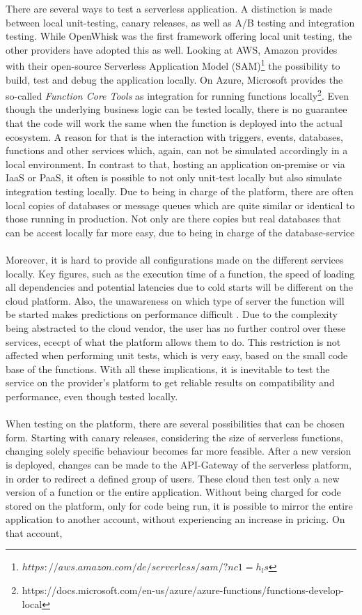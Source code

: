 \documentclass[a4paper,twoside,11pt, pagesize]{scrartcl}
\begin{document}
\begin{spacing}{1.2}
There are several ways to test a serverless application. A distinction is made between local unit-testing, canary releases, as well as A/B testing and integration testing. While OpenWhisk was the first framework offering local unit testing, the other providers have adopted this as well. Looking at AWS, Amazon provides with their open-source Serverless Application Model (SAM)\footnote{$https://aws.amazon.com/de/serverless/sam/?nc1=h_ls$} the possibility to build, test and debug the application locally. On Azure, Microsoft provides the so-called \textit{Function Core Tools} as integration for running functions locally\footnote{https://docs.microsoft.com/en-us/azure/azure-functions/functions-develop-local}. Even though the underlying business logic can be tested locally, there is no guarantee that the code will work the same when the function is deployed into the actual ecosystem. A reason for that is the interaction with triggers, events, databases, functions and other services which, again, can not be simulated accordingly in a local environment. In contrast to that, hosting an application on-premise or via IaaS or PaaS, it often is possible to not only unit-test locally but also simulate integration testing locally. Due to being in charge of the platform, there are often local copies of databases or message queues which are quite similar or identical to those running in production. Not only are there copies but real databases that can be accest locally far more easy, due to being in charge of the \glqq database-service\grqq{}\\\\ Moreover, it is hard to provide all configurations made on the different services locally. Key figures, such as the execution time of a function, the speed of loading all dependencies and potential latencies due to cold starts will be different on the cloud platform. Also, the unawareness on which type of server the function will be started makes predictions on performance difficult \cite{racicot2019quality}. Due to the complexity being abstracted to the cloud vendor, the user has no further control over these services, ececpt of what the platform allows them to do. This restriction is not affected when performing unit tests, which is very easy, based on the small code base of the functions. With all these implications, it is inevitable to test the service on the provider's platform to get reliable results on compatibility and performance, even though tested locally.\\\\ When testing on the platform, there are several possibilities that can be chosen form. Starting with canary releases, considering the size of serverless functions, changing solely specific behaviour becomes far more feasible. After a new version is deployed, changes can be made to the API-Gateway of the serverless platform, in order to redirect a defined group of users. These cloud then test only a new version of a function or the entire application. Without being charged for code stored on the platform, only for code being run, it is possible to mirror the entire application to another account, without experiencing an increase in pricing. On that account, 
\end{spacing}
\end{document}
